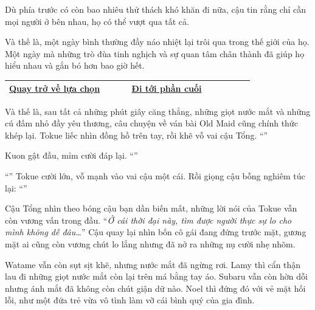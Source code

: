 \documentclass[../main.tex]{subfiles}
\begin{document}
Dù phía trước có còn bao nhiêu thử thách khó khăn đi nữa, cậu tin rằng chỉ cần mọi người ở bên nhau, họ có thể vượt qua tất cả.

Và thế là, một ngày bình thường đầy náo nhiệt lại trôi qua trong thế giới của họ. Một ngày mà những trò đùa tinh nghịch và sự quan tâm chân thành đã giúp họ hiểu nhau và gắn bó hơn bao giờ hết.

\begin{table}[H]
  \centering
  \setlength{\arrayrulewidth}{1pt}
  \begin{tabular}{|>{\centering\arraybackslash}p{0.4\linewidth}|>{\centering\arraybackslash}p{0.4\linewidth}|}
    \hline
    \hyperref[choice]{Quay trở về lựa chọn} & \hyperref[ending]{Đi tới phần cuối} \\ \hline
  \end{tabular}
\end{table}

\newpage
\label{ending}
\omk
Và thế là, sau tất cả những phút giây căng thẳng, những giọt nước mắt và những cú đấm nhỏ đầy yêu thương, câu chuyện về ván bài Old Maid cũng chính thức khép lại. Tokue liếc nhìn đồng hồ trên tay, rồi khẽ vỗ vai cậu Tổng. ``''

Kuon gật đầu, mỉm cười đáp lại. ``''

``'' Tokue cười lớn, vỗ mạnh vào vai cậu một cái. Rồi giọng cậu bỗng nghiêm túc lại: ``''

Cậu Tổng nhìn theo bóng cậu bạn dần biến mất, những lời nói của Tokue vẫn còn vương vấn trong đầu. ``\textit{Ở cái thời đại này, tìm được người thực sự lo cho mình không dễ đâu\dots}'' Cậu quay lại nhìn bốn cô gái đang đứng trước mặt, gương mặt ai cũng còn vương chút lo lắng nhưng đã nở ra những nụ cười nhẹ nhõm.

Watame vẫn còn sụt sịt khẽ, nhưng nước mắt đã ngừng rơi. Lamy thì cẩn thận lau đi những giọt nước mắt còn lại trên má bằng tay áo. Subaru vẫn còn hờn dỗi nhưng ánh mắt đã không còn chút giận dữ nào. Noel thì đứng đó với vẻ mặt hối lỗi, như một đứa trẻ vừa vô tình làm vỡ cái bình quý của gia đình.
\end{document}
